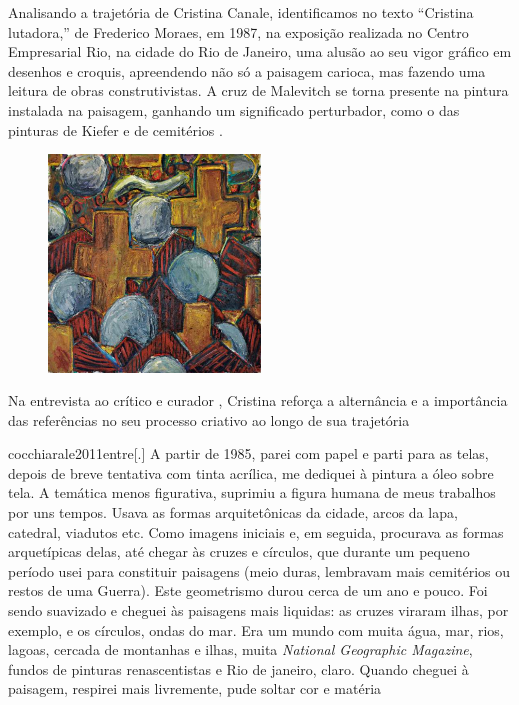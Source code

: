 Analisando a trajetória de Cristina Canale, identificamos no texto
\enquote{Cristina lutadora,} de Frederico Moraes, em 1987, na exposição
realizada no Centro Empresarial Rio, na cidade do Rio de Janeiro, uma
alusão ao seu vigor gráfico em desenhos e croquis, apreendendo não só a
paisagem carioca, mas fazendo uma leitura de obras construtivistas. A
cruz de Malevitch se torna presente na pintura instalada na paisagem,
ganhando um significado perturbador, como o das pinturas de Kiefer e de
cemitérios \parencite{demoraes1987cristina}.

\begin{figure}
	\caption{}
	\includegraphics[width=2.22414in,height=2.27465in]{figuras/canale-sobreviventes-1985.pdf.compressed.pdf}

\end{figure}

Na entrevista ao crítico e curador \textcite{cocchiarale2011entre}, Cristina reforça
a alternância e a importância das referências no seu processo criativo
ao longo de sua trajetória

\begin{displaycquote}{cocchiarale2011entre}[.]
	A partir de 1985, parei com papel e parti para as telas, depois de breve
	tentativa com tinta acrílica, me dediquei à pintura a óleo sobre tela. A
	temática menos figurativa, suprimiu a figura humana de meus trabalhos
	por uns tempos. Usava as formas arquitetônicas da cidade, arcos da lapa,
	catedral, viadutos etc. Como imagens iniciais e, em seguida, procurava
	as formas arquetípicas delas, até chegar às cruzes e círculos, que
	durante um pequeno período usei para constituir paisagens (meio duras,
	lembravam mais cemitérios ou restos de uma Guerra). Este geometrismo
	durou cerca de um ano e pouco. Foi sendo suavizado e cheguei às
	paisagens mais liquidas: as cruzes viraram ilhas, por exemplo, e os
	círculos, ondas do mar. Era um mundo com muita água, mar, rios, lagoas,
	cercada de montanhas e ilhas, muita \emph{National Geographic Magazine},
	fundos de pinturas renascentistas e Rio de janeiro, claro. Quando
	cheguei à paisagem, respirei mais livremente, pude soltar cor e matéria
\end{displaycquote}


